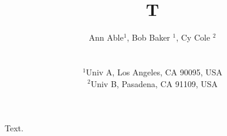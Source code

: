 \documentclass{mnras}
\begin{document}
\title{T}
\author[Able et al.]{\parbox{\textwidth}{
Ann Able$^{1}$, Bob Baker $^{1}$, Cy Cole $^{2}$}
\\
\parbox{\textwidth}{
$^{1}$Univ A, Los Angeles,
CA 90095, USA\\
$^{2}$Univ B, Pasadena, CA 91109, USA
}}
\maketitle
Text.
\end{document}
